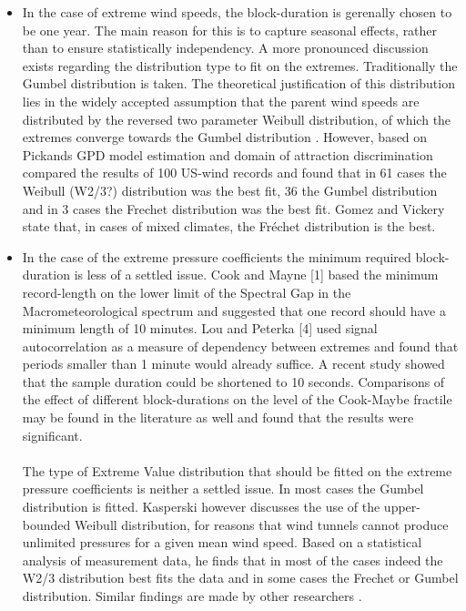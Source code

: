 \documentclass[fleqn]{article}
\begin{document}
\begin{itemize}
\item In the case of extreme wind speeds, the block-duration is gerenally chosen to be one year. The main reason for this is to capture seasonal effects, rather than to ensure statistically independency. A more pronounced discussion exists regarding the distribution type to fit on the extremes. Traditionally the Gumbel distribution is taken. The theoretical justification of this distribution lies in the widely accepted assumption that the parent wind speeds are distributed by the reversed two parameter Weibull distribution, of which the extremes converge towards the Gumbel distribution \cite{Cook,Gumbel?}. However, based on Pickands GPD model estimation\cite{} and domain of attraction discrimination \cite{} \cite{Lechner_1992} compared the results of 100 US-wind records and found that in 61 cases the Weibull (W2/3?) distribution was the best fit, 36 the Gumbel distribution and in 3 cases the Frechet distribution was the best fit. Gomez and Vickery state that, in cases of mixed climates, the Fr\'{e}chet distribution is the best.

\item In the case of the extreme pressure coefficients the minimum required block-duration is less of a settled issue. Cook and Mayne [1] based the minimum record-length on the lower limit of the Spectral Gap in the Macrometeorological spectrum and suggested that one record should have a minimum length of 10 minutes. Lou and Peterka [4] used signal autocorrelation as a measure of dependency between extremes and found that periods smaller than 1 minute would already suffice. A recent study \cite{Meinen_2015} showed that the sample duration could be shortened to 10 seconds. Comparisons of the effect of different block-durations on the level of the Cook-Maybe fractile may be found in the literature as well \cite{Cook}\cite{Gavanski_2013}\cite{Peng201411} \cite{Quan_2014} and found that the results were significant. \\
\\
The type of Extreme Value distribution that should be fitted on the extreme pressure coefficients is neither a settled issue. In most  cases the Gumbel distribution is fitted. Kasperski however \cite{Kasperski2003527} discusses the use of the upper-bounded Weibull distribution, for reasons that wind tunnels cannot produce unlimited pressures for a given mean wind speed. Based on a statistical analysis of measurement data, he finds that in most of the cases indeed the W2/3 distribution best fits the data and in some cases the Frechet or Gumbel distribution. Similar findings are made by other researchers \cite{Holmes2003893, Quan_2014}. 
\end{itemize}
\end{document}
